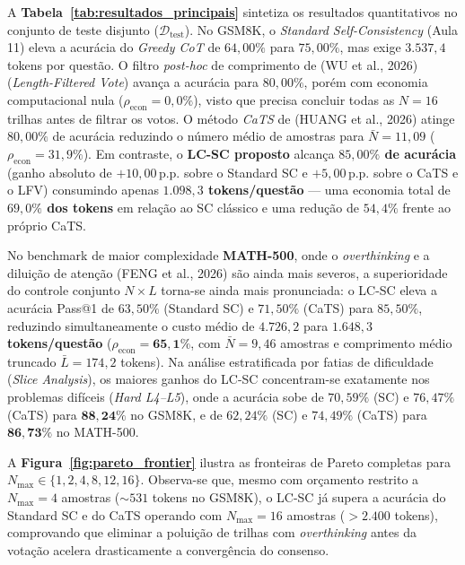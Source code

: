 \documentclass[9pt,conference]{IEEEtran}
\begin{document}
A \textbf{Tabela~\ref{tab:resultados_principais}} sintetiza os resultados quantitativos no conjunto de teste disjunto ($\mathcal{D}_{\text{test}}$). No GSM8K, o \textit{Standard Self-Consistency} (Aula 11) eleva a acur\'{a}cia do \textit{Greedy CoT} de $64,00\%$ para $75,00\%$, mas exige $3.537,4$ tokens por quest\~{a}o. O filtro \textit{post-hoc} de comprimento de (WU et al., 2026) (\textit{Length-Filtered Vote}) avan\c{c}a a acur\'{a}cia para $80,00\%$, por\'{e}m com economia computacional nula ($\rho_{\text{econ}} = 0,0\%$), visto que precisa concluir todas as $N=16$ trilhas antes de filtrar os votos. O m\'{e}todo \textit{CaTS} de (HUANG et al., 2026) atinge $80,00\%$ de acur\'{a}cia reduzindo o n\'{u}mero m\'{e}dio de amostras para $\bar{N}=11,09$ ($\rho_{\text{econ}} = 31,9\%$). Em contraste, o \textbf{LC-SC proposto} alcan\c{c}a \textbf{$85,00\%$ de acur\'{a}cia} (ganho absoluto de $+10,00$\,p.p. sobre o Standard SC e $+5,00$\,p.p. sobre o CaTS e o LFV) consumindo apenas \textbf{$1.098,3$ tokens/quest\~{a}o} --- uma economia total de \textbf{$69,0\%$ dos tokens} em rela\c{c}\~{a}o ao SC cl\'{a}ssico e uma redu\c{c}\~{a}o de $54,4\%$ frente ao pr\'{o}prio CaTS.

No benchmark de maior complexidade \textbf{MATH-500}, onde o \textit{overthinking} e a dilui\c{c}\~{a}o de aten\c{c}\~{a}o (FENG et al., 2026) s\~{a}o ainda mais severos, a superioridade do controle conjunto $N \times L$ torna-se ainda mais pronunciada: o LC-SC eleva a acur\'{a}cia Pass@1 de $63,50\%$ (Standard SC) e $71,50\%$ (CaTS) para \textbf{$85,50\%$}, reduzindo simultaneamente o custo m\'{e}dio de $4.726,2$ para \textbf{$1.648,3$ tokens/quest\~{a}o} ($\rho_{\text{econ}} = \mathbf{65,1\%}$, com $\bar{N}=9,46$ amostras e comprimento m\'{e}dio truncado $\bar{L}=174,2$ tokens). Na an\'{a}lise estratificada por fatias de dificuldade (\textit{Slice Analysis}), os maiores ganhos do LC-SC concentram-se exatamente nos problemas dif\'{i}ceis (\textit{Hard L4--L5}), onde a acur\'{a}cia sobe de $70,59\%$ (SC) e $76,47\%$ (CaTS) para $\mathbf{88,24\%}$ no GSM8K, e de $62,24\%$ (SC) e $74,49\%$ (CaTS) para $\mathbf{86,73\%}$ no MATH-500.

A \textbf{Figura~\ref{fig:pareto_frontier}} ilustra as fronteiras de Pareto completas para $N_{\max} \in \{1, 2, 4, 8, 12, 16\}$. Observa-se que, mesmo com or\c{c}amento restrito a $N_{\max}=4$ amostras ($\sim 531$ tokens no GSM8K), o LC-SC j\'{a} supera a acur\'{a}cia do Standard SC e do CaTS operando com $N_{\max}=16$ amostras ($>2.400$ tokens), comprovando que eliminar a polui\c{c}\~{a}o de trilhas com \textit{overthinking} antes da vota\c{c}\~{a}o acelera drasticamente a converg\^{e}ncia do consenso.
\end{document}
